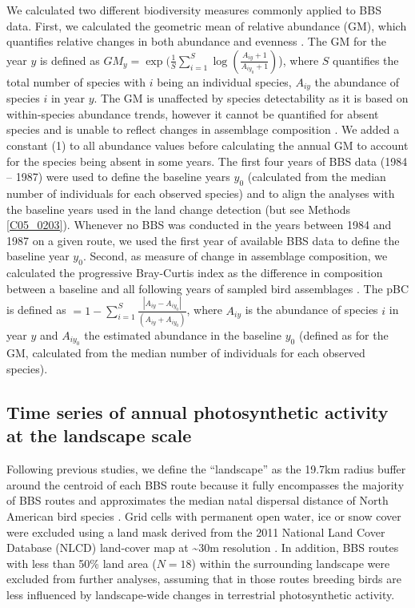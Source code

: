 We calculated two different biodiversity measures commonly applied to BBS data. First, we calculated the geometric mean of relative abundance (GM), which quantifies relative changes in both abundance and evenness \citep{Buckland2011,Buckland2017,Harrison2014}. The GM for the year $y$ is defined as $GM_{y} = \exp(\frac{1}{S} \sum_{i=1}^{S} \log(\frac{ A_{iy}+1 }{A_{iy_0}+1 })$), where $S$ quantifies the total number of species with $i$ being an individual species, $A_{iy}$ the abundance of species $i$ in year $y$. The GM is unaffected by species detectability as it is based on within-species abundance trends, however it cannot be quantified for absent species and is unable to reflect changes in assemblage composition \citep{Buckland2011}. We added a constant (1) to all abundance values before calculating the annual GM to account for the species being absent in some years. The first four years of BBS data (1984 – 1987) were used to define the baseline years $y_{0}$ (calculated from the median number of individuals for each observed species) and to align the analyses with the baseline years used in the land change detection (but see Methods \ref{C05_0203}). Whenever no BBS was conducted in the years between 1984 and 1987 on a given route, we used the first year of available BBS data to define the baseline year $y_0$. Second, as measure of change in assemblage composition, we calculated the progressive Bray-Curtis index \citep[pBC, ][]{Bray1957,Rittenhouse2010} as the difference in composition between a baseline and all following years of sampled bird assemblages \citep{Rittenhouse2010}. The pBC is defined as $ = 1 - \sum_{i=1}^{S} \frac{ |A_{iy} - A_{iy_0}| }{ (A_{iy} + A_{iy_{0}}) } $, where $A_{iy}$ is the abundance of species $i$ in year $y$ and $A_{iy_{0}}$ the estimated abundance in the baseline $y_0$ (defined as for the GM, calculated from the median number of individuals for each observed species).


\subsection{Time series of annual photosynthetic activity at the landscape scale}
\label{C05_0202}

Following previous studies, we define the “landscape” as the 19.7km radius buffer around the centroid of each BBS route because it fully encompasses the majority of BBS routes and approximates the median natal dispersal distance of North American bird species \citep{Sutherland2000,Pidgeon2007,Albright2011}. Grid cells with permanent open water, ice or snow cover were excluded using a land mask derived from the 2011 National Land Cover Database (NLCD) land-cover map at \textasciitilde 30m resolution \citep{Homer2015}. In addition, BBS routes with less than 50\% land area ($N = 18$) within the surrounding landscape were excluded from further analyses, assuming that in those routes breeding birds are less influenced by landscape-wide changes in terrestrial photosynthetic activity.

